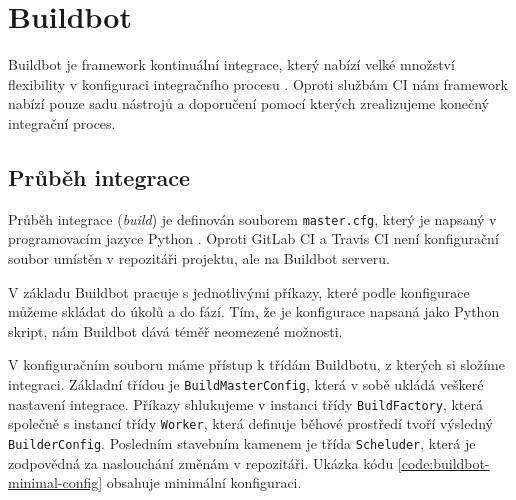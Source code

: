 \section{Buildbot}

Buildbot je framework kontinuální integrace, který nabízí velké množství flexibility v konfiguraci integračního procesu \cite{buildbot}.
Oproti službám CI nám framework nabízí pouze sadu nástrojů a doporučení pomocí kterých zrealizujeme konečný integrační proces.

\subsection{Průběh integrace}

Průběh integrace (\textit{build}) je definován souborem \verb|master.cfg|, který je napsaný v programovacím jazyce Python \cite{buildbot_manual}.
Oproti GitLab CI a Travis CI není konfigurační soubor umístěn v repozitáři projektu, ale na Buildbot serveru.

V základu Buildbot pracuje s jednotlivými příkazy, které podle konfigurace můžeme skládat do úkolů a do fází.
Tím, že je konfigurace napsaná jako Python skript, nám Buildbot dává téměř neomezené možnosti.

V konfiguračním souboru máme přístup k třídám Buildbotu, z kterých si složíme integraci.
Základní třídou je \verb|BuildMasterConfig|, která v sobě ukládá veškeré nastavení integrace.
Příkazy shlukujeme v instanci třídy \verb|BuildFactory|, která společně s instancí třídy \verb|Worker|, která definuje běhové prostředí tvoří výsledný \verb|BuilderConfig|.
Posledním stavebním kamenem je třída \verb|Scheluder|, která je zodpovědná za naslouchání změnám v repozitáři.
Ukázka kódu \ref{code:buildbot-minimal-config} obsahuje minimální konfiguraci.

